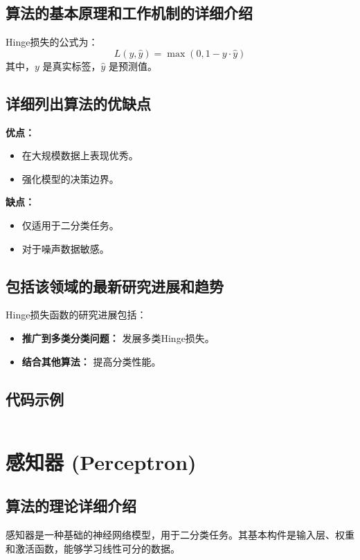 \subsection*{算法的基本原理和工作机制的详细介绍}
Hinge损失的公式为：
\[
    L(y, \hat{y}) = \max(0, 1 - y \cdot \hat{y})
\]
其中，\(y\) 是真实标签，\(\hat{y}\) 是预测值。

\subsection*{详细列出算法的优缺点}
\textbf{优点：}
\begin{itemize}
    \item 在大规模数据上表现优秀。
    \item 强化模型的决策边界。
\end{itemize}

\textbf{缺点：}
\begin{itemize}
    \item 仅适用于二分类任务。
    \item 对于噪声数据敏感。
\end{itemize}

\subsection*{包括该领域的最新研究进展和趋势}
Hinge损失函数的研究进展包括：
\begin{itemize}
    \item \textbf{推广到多类分类问题：} 发展多类Hinge损失。
    \item \textbf{结合其他算法：} 提高分类性能。
\end{itemize}
\subsection*{代码示例}
\begin{lstlisting}

\end{lstlisting}


\section{感知器 (Perceptron)}
\subsection*{算法的理论详细介绍}
感知器是一种基础的神经网络模型，用于二分类任务。其基本构件是输入层、权重和激活函数，能够学习线性可分的数据。

